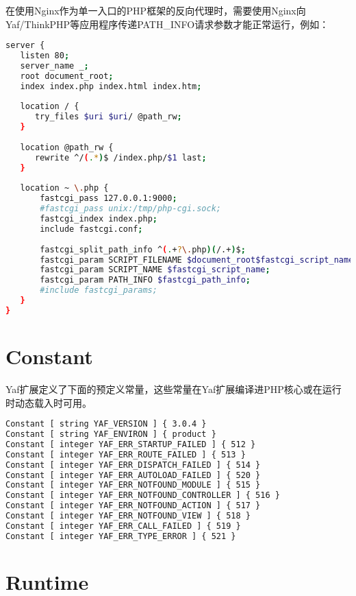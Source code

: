 在使用Nginx作为单一入口的PHP框架的反向代理时，需要使用Nginx向Yaf/ThinkPHP等应用程序传递PATH\_INFO请求参数才能正常运行，例如：


\begin{lstlisting}[language=bash]
server {
   listen 80;
   server_name _;
   root document_root;
   index index.php index.html index.htm;
   
   location / {
      try_files $uri $uri/ @path_rw;
   }
   
   location @path_rw {
      rewrite ^/(.*)$ /index.php/$1 last;
   }
   
   location ~ \.php {
       fastcgi_pass 127.0.0.1:9000;
       #fastcgi_pass unix:/tmp/php-cgi.sock;
       fastcgi_index index.php;
       include fastcgi.conf;
       
       fastcgi_split_path_info ^(.+?\.php)(/.+)$;
       fastcgi_param SCRIPT_FILENAME $document_root$fastcgi_script_name;
       fastcgi_param SCRIPT_NAME $fastcgi_script_name;
       fastcgi_param PATH_INFO $fastcgi_path_info;
       #include fastcgi_params;  
   }
}
\end{lstlisting}







\section{Constant}

Yaf扩展定义了下面的预定义常量，这些常量在Yaf扩展编译进PHP核心或在运行时动态载入时可用。

\begin{lstlisting}[language=bash]
Constant [ string YAF_VERSION ] { 3.0.4 }
Constant [ string YAF_ENVIRON ] { product }
Constant [ integer YAF_ERR_STARTUP_FAILED ] { 512 }
Constant [ integer YAF_ERR_ROUTE_FAILED ] { 513 }
Constant [ integer YAF_ERR_DISPATCH_FAILED ] { 514 }
Constant [ integer YAF_ERR_AUTOLOAD_FAILED ] { 520 }
Constant [ integer YAF_ERR_NOTFOUND_MODULE ] { 515 }
Constant [ integer YAF_ERR_NOTFOUND_CONTROLLER ] { 516 }
Constant [ integer YAF_ERR_NOTFOUND_ACTION ] { 517 }
Constant [ integer YAF_ERR_NOTFOUND_VIEW ] { 518 }
Constant [ integer YAF_ERR_CALL_FAILED ] { 519 }
Constant [ integer YAF_ERR_TYPE_ERROR ] { 521 }
\end{lstlisting}




\section{Runtime}

